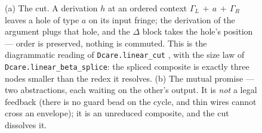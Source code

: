 \begin{figure}[t]
\caption{(a) The cut. A derivation $h$ at an ordered context
$\Gamma_L \,{+}\, a \,{+}\, \Gamma_R$ leaves a hole of type $a$ on its input
fringe; the derivation of the argument plugs that hole, and the $\Delta$
block takes the hole's position — order is preserved, nothing is commuted.
This is the diagrammatic reading of \texttt{Dcare.linear\_cut}
, with the size law of
\texttt{Dcare.linear\_beta\_splice}: the spliced composite is exactly three
nodes smaller than the redex it resolves.
(b) The mutual promise — two abstractions, each waiting on the other's
output. It is \emph{not} a legal feedback (there is no guard bead on the
cycle, and thin wires cannot cross an envelope); it is an unreduced
composite, and the cut dissolves it.}
\label{fig:cut}
\end{figure}
